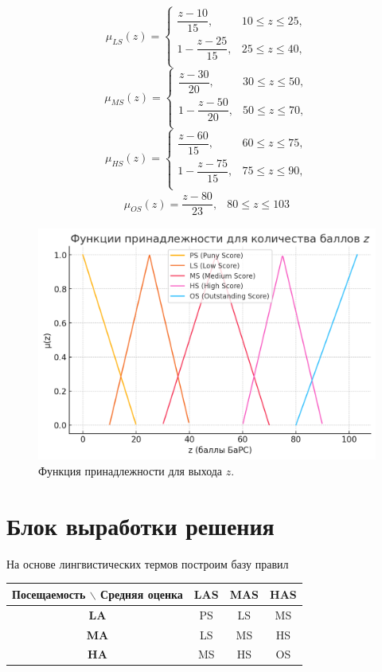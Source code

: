 \documentclass{article}
\begin{document}
\[
\mu_{LS}(z) =
\begin{cases}
\dfrac{z - 10}{15}, & 10 \le z \le 25,\\
1 - \dfrac{z - 25}{15}, & 25 \le z \le 40,\\
\end{cases}
\]
\[
\mu_{MS}(z) =
\begin{cases}
\dfrac{z - 30}{20}, & 30 \le z \le 50,\\
1 - \dfrac{z - 50}{20}, & 50 \le z \le 70,\\
\end{cases}
\]
\[
\mu_{HS}(z) =
\begin{cases}
\dfrac{z - 60}{15}, & 60 \le z \le 75,\\
1 - \dfrac{z - 75}{15}, & 75 \le z \le 90,\\
\end{cases}
\]
\begin{align*}
    \mu_{OS}(z) = \dfrac{z - 80}{23}, & 80 \le z \le 103    
\end{align*}



\begin{figure}[h!]
    \centering
    \includegraphics[width=0.8\linewidth]{membership_z.png}
    \caption{Функция принадлежности для выхода $z$.}
    \label{fig:membership_z}
\end{figure}

\newpage
\section{Блок выработки решения}

На основе лингвистических термов построим базу правил

\begin{center}
\begin{tabular}{|c|c|c|c|}
\hline
\multicolumn{1}{|c|}{\textbf{Посещаемость $\backslash$ Средняя оценка}} & \textbf{LAS} & \textbf{MAS} & \textbf{HAS} \\ \hline
\textbf{LA}   & PS   & LS   & MS   \\ \hline
\textbf{MA}  & LS   & MS   & HS   \\ \hline
\textbf{HA}  & MS   & HS   & OS   \\ \hline
\end{tabular}
\end{center}
\end{document}
